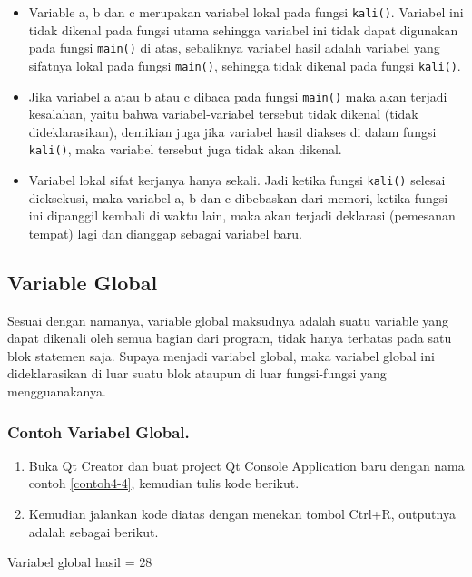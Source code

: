\begin{itemize}

\item
  Variable a, b dan c merupakan variabel lokal pada fungsi
  \texttt{kali()}. Variabel ini tidak dikenal pada fungsi utama sehingga
  variabel ini tidak dapat digunakan pada fungsi \texttt{main()} di
  atas, sebaliknya variabel hasil adalah variabel yang sifatnya lokal
  pada fungsi \texttt{main()}, sehingga tidak dikenal pada fungsi
  \texttt{kali()}.\\
\item
  Jika variabel a atau b atau c dibaca pada fungsi \texttt{main()} maka
  akan terjadi kesalahan, yaitu bahwa variabel-variabel tersebut tidak
  dikenal (tidak dideklarasikan), demikian juga jika variabel hasil
  diakses di dalam fungsi \texttt{kali()}, maka variabel tersebut juga
  tidak akan dikenal.\\
\item
  Variabel lokal sifat kerjanya hanya sekali. Jadi ketika fungsi
  \texttt{kali()} selesai dieksekusi, maka variabel a, b dan c
  dibebaskan dari memori, ketika fungsi ini dipanggil kembali di waktu
  lain, maka akan terjadi deklarasi (pemesanan tempat) lagi dan dianggap
  sebagai variabel baru.
\end{itemize}

\subsection{Variable Global}\label{variable-global}

Sesuai dengan namanya, variable global maksudnya adalah suatu variable
yang dapat dikenali oleh semua bagian dari program, tidak hanya terbatas
pada satu blok statemen saja. Supaya menjadi variabel global, maka
variabel global ini dideklarasikan di luar suatu blok ataupun di luar
fungsi-fungsi yang mengguanakanya.

\subsubsection*{Contoh  Variabel Global.}

\begin{enumerate}

\item
  Buka Qt Creator dan buat project Qt Console Application baru dengan
  nama contoh \ref{contoh4-4}, kemudian tulis kode berikut.




\item
  Kemudian jalankan kode diatas dengan menekan tombol Ctrl+R, outputnya
  adalah sebagai berikut.
\end{enumerate}
\begin{lcverbatim}
Variabel global hasil = 28
\end{lcverbatim}


